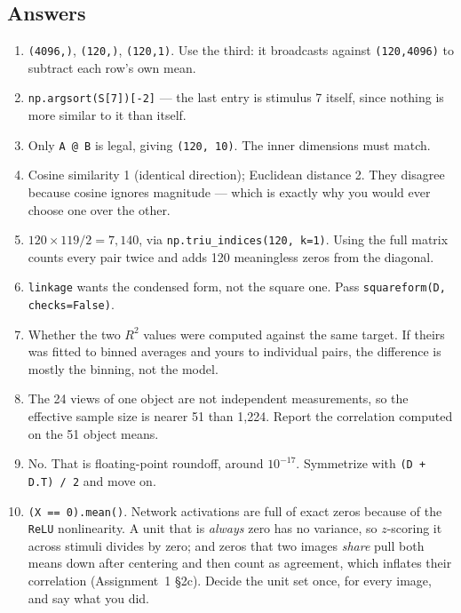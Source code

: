 \documentclass[11pt]{article}
\begin{document}
\subsection*{Answers}
\small
\begin{enumerate}
\item \texttt{(4096,)}, \texttt{(120,)}, \texttt{(120,1)}. Use the third: it
      broadcasts against \texttt{(120,4096)} to subtract each row's own mean.
\item \texttt{np.argsort(S[7])[-2]} --- the last entry is stimulus 7 itself,
      since nothing is more similar to it than itself.
\item Only \texttt{A @ B} is legal, giving \texttt{(120, 10)}. The inner
      dimensions must match.
\item Cosine similarity 1 (identical direction); Euclidean distance 2. They
      disagree because cosine ignores magnitude --- which is exactly why you
      would ever choose one over the other.
\item $120 \times 119 / 2 = 7{,}140$, via \texttt{np.triu\_indices(120, k=1)}.
      Using the full matrix counts every pair twice and adds 120 meaningless
      zeros from the diagonal.
\item \texttt{linkage} wants the condensed form, not the square one. Pass
      \texttt{squareform(D, checks=False)}.
\item Whether the two $R^2$ values were computed against the same target. If
      theirs was fitted to binned averages and yours to individual pairs, the
      difference is mostly the binning, not the model.
\item The 24 views of one object are not independent measurements, so the
      effective sample size is nearer 51 than 1{,}224. Report the correlation
      computed on the 51 object means.
\item No. That is floating-point roundoff, around $10^{-17}$. Symmetrize with
      \texttt{(D + D.T) / 2} and move on.
\item \texttt{(X == 0).mean()}. Network activations are full of exact zeros
      because of the \texttt{ReLU} nonlinearity. A unit that is \emph{always}
      zero has no variance, so $z$-scoring it across stimuli divides by zero;
      and zeros that two images \emph{share} pull both means down after
      centering and then count as agreement, which inflates their correlation
      (Assignment~1 \S2c). Decide the unit set once, for every image, and say
      what you did.
\end{enumerate}
\end{document}
